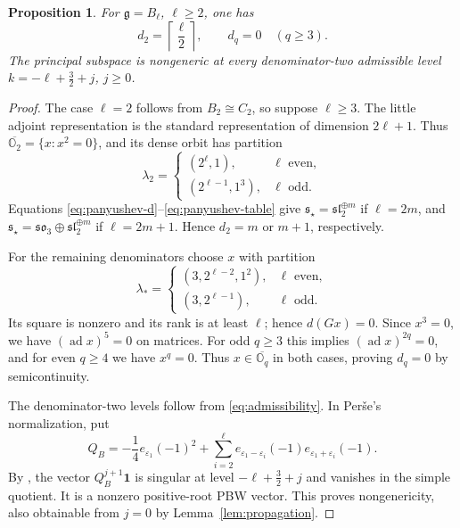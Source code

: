 \documentclass[11pt]{amsart}
\newtheorem{proposition}[theorem]{Proposition}
\theoremstyle{definition}
\theoremstyle{remark}
\newcommand{\g}{\mathfrak g}
\newcommand{\vac}{\mathbf1}
\newcommand{\slalg}{\mathfrak{sl}}
\newcommand{\soalg}{\mathfrak{so}}
\DeclareMathOperator{\ad}{ad}
\begin{document}
\begin{proposition}\label{prop:typeB}
For $\g=B_\ell$, $\ell\ge2$, one has
\[
 d_2=\left\lceil\frac\ell2\right\rceil,\qquad
 d_q=0\quad(q\ge3).
\]
The principal subspace is nongeneric at every denominator-two
admissible level $k=-\ell+\frac32+j$, $j\ge0$.
\end{proposition}
\begin{proof}
The case $\ell=2$ follows from $B_2\cong C_2$, so suppose
$\ell\ge3$. The little adjoint representation is the standard
representation of dimension $2\ell+1$. Thus
$\overline{\mathbb O_2}=\{x:x^2=0\}$, and its dense orbit has
partition
\[
 \lambda_2=\begin{cases}(2^\ell,1),&\ell\text{ even},\\
 (2^{\ell-1},1^3),&\ell\text{ odd}.
 \end{cases}
\]
Equations \eqref{eq:panyushev-d}--\eqref{eq:panyushev-table} give
$\mathfrak s_\star=\slalg_2^{\oplus m}$ if $\ell=2m$, and
$\mathfrak s_\star=\soalg_3\oplus\slalg_2^{\oplus m}$ if
$\ell=2m+1$. Hence $d_2=m$ or $m+1$, respectively.

For the remaining denominators choose $x$ with partition
\[
 \lambda_*=\begin{cases}(3,2^{\ell-2},1^2),&\ell\text{ even},\\
 (3,2^{\ell-1}),&\ell\text{ odd}.
 \end{cases}
\]
Its square is nonzero and its rank is at least $\ell$; hence
$d(Gx)=0$. Since $x^3=0$, we have $(\ad x)^5=0$ on matrices.
For odd $q\ge3$ this implies $(\ad x)^{2q}=0$, and for even
$q\ge4$ we have $x^q=0$. Thus $x\in\overline{\mathbb O_q}$
in both cases, proving $d_q=0$ by semicontinuity.

The denominator-two levels follow from \eqref{eq:admissibility}.
In Per\v se's normalization, put
\[
 Q_B=-\frac14e_{\varepsilon_1}(-1)^2
 +\sum_{i=2}^{\ell}e_{\varepsilon_1-\varepsilon_i}(-1)
                         e_{\varepsilon_1+\varepsilon_i}(-1).
\]
By \cite[Lemma~3.2 and Theorem~3.3]{PerseB}, the vector
$Q_B^{j+1}\vac$ is singular at level $-\ell+\frac32+j$ and
vanishes in the simple quotient. It is a nonzero positive-root
PBW vector. This proves nongenericity, also obtainable from $j=0$
by Lemma~\ref{lem:propagation}.
\end{proof}
\end{document}
